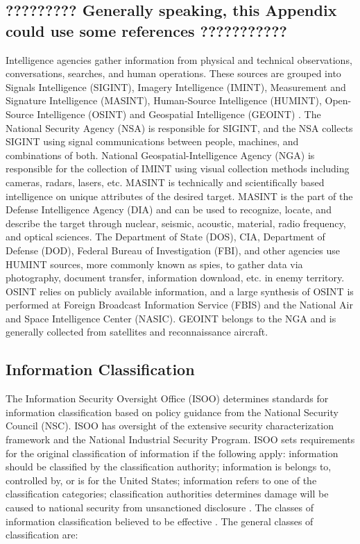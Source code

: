 \documentclass{report}
\begin{document}
\subsection{?????????  Generally speaking, this Appendix could use some references ???????????}

Intelligence agencies gather information from physical and technical observations, conversations, searches, and human operations. These sources are grouped into Signals Intelligence (SIGINT), Imagery Intelligence (IMINT), Measurement and Signature Intelligence (MASINT), Human-Source Intelligence (HUMINT), Open-Source Intelligence (OSINT) and Geospatial Intelligence (GEOINT) \cite{Intelligen}. The National Security Agency (NSA) is responsible for SIGINT, and the NSA collects SIGINT using signal communications between people, machines, and combinations of both. National Geospatial-Intelligence Agency (NGA) is responsible for the collection of IMINT using visual collection methods including cameras, radars, lasers, etc. MASINT is technically and scientifically based intelligence on unique attributes of the desired target. MASINT is the part of the Defense Intelligence Agency (DIA) and can be used to recognize, locate, and describe the target through nuclear, seismic, acoustic, material, radio frequency, and optical sciences. The Department of State (DOS), CIA, Department of Defense (DOD), Federal Bureau of Investigation (FBI), and other agencies use HUMINT sources, more commonly known as spies, to gather data via photography, document transfer, information download, etc. in enemy territory. OSINT relies on publicly available information, and a large synthesis of OSINT is performed at Foreign Broadcast Information Service (FBIS) and the National Air and Space Intelligence Center (NASIC). GEOINT belongs to the NGA and is generally collected from satellites and reconnaissance aircraft. 

\subsection{Information Classification}

The Information Security Oversight Office (ISOO) determines standards for information classification based on policy guidance from the National Security Council (NSC). ISOO has oversight of the extensive security characterization framework and the National Industrial Security Program. ISOO sets requirements for the original classification of information if the following apply: information should be classified by the classification authority; information is belongs to, controlled by, or is for the United States; information refers to one of the classification categories; classification authorities determines damage will be caused to national security from unsanctioned disclosure \cite{Office2010}. The classes of information classification believed to be effective \cite{Richelson2011,Office2010}.  The general classes of classification are:
\end{document}
